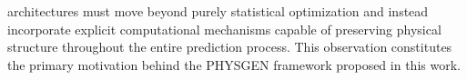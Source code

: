 architectures must move beyond purely statistical optimization and instead incorporate explicit computational mechanisms capable of preserving physical structure throughout the entire prediction process. This observation constitutes the primary motivation behind the PHYSGEN framework proposed in this work. \] 
